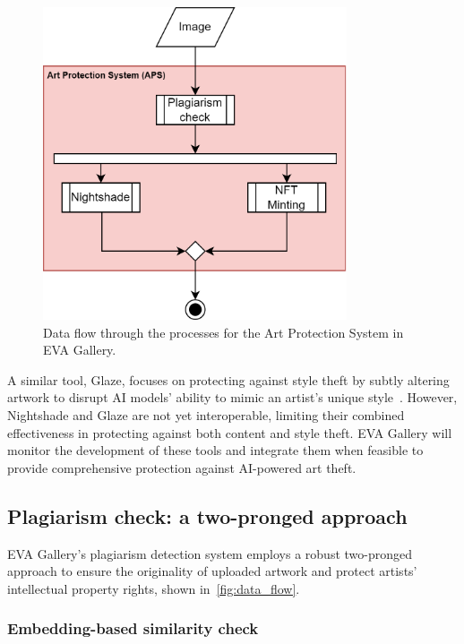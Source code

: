 \begin{figure}[ht]
    \centering
    \includegraphics[width=0.8\textwidth]{figs/aps.png}
    \caption{Data flow through the processes for the Art Protection System in EVA Gallery.}
    \label{fig:data_flow}
\end{figure}

A similar tool, Glaze, focuses on protecting against style theft by subtly altering artwork to disrupt AI models' ability to mimic an artist's unique style~\cite{shan2023glaze}. However, Nightshade and Glaze are not yet interoperable, limiting their combined effectiveness in protecting against both content and style theft. EVA Gallery will monitor the development of these tools and integrate them when feasible to provide comprehensive protection against AI-powered art theft.

\subsection{Plagiarism check: a two-pronged approach}

EVA Gallery's plagiarism detection system employs a robust two-pronged approach to ensure the originality of uploaded artwork and protect artists' intellectual property rights, shown in~\autoref{fig:data_flow}.

\subsubsection{Embedding-based similarity check}

